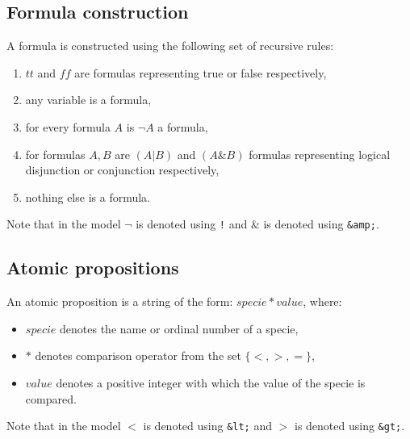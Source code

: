 \documentclass[12pt]{article}
\begin{document}
\subsection{Formula construction}
\label{FormulaConstruction}
A formula is constructed using the following set of recursive rules:
\begin{enumerate}
\item $tt$ and $ff$ are formulas representing true or false respectively,
\item any variable is a formula,
\item for every formula $A$ is $\neg A$ a formula,
\item for formulas $A,B$ are $(A|B)$ and $(A\&B)$ formulas representing logical disjunction or conjunction respectively,
\item nothing else is a formula.
\end{enumerate}
Note that in the model $\neg$ is denoted using \texttt{!} and $\&$ is denoted using \texttt{\&amp;}.

\subsection{Atomic propositions}
\label{AtomicPropositions}
An atomic proposition is a string of the form: $specie*value$, where:
\begin{itemize}
\item $specie$ denotes the name or ordinal number of a specie,
\item $*$ denotes comparison operator from the set $\{<,>,=\}$,
\item $value$ denotes a positive integer with which the value of the specie is compared.
\end{itemize}
Note that in the model $<$ is denoted using \texttt{\&lt;} and $>$ is denoted using \texttt{\&gt;}.



\end{document}
